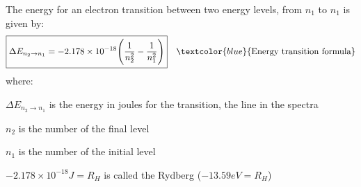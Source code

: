 \documentclass[main.tex]{subfiles}
\newcommand\chapterlabel{electrons}
\begin{document}
\begin{description}
\begin{center}
{}\end{center}


 

 
 
 
The energy for an electron transition between two energy levels, from $n_1$ to $n_1$ is given by:
\begin{equation*}
\boxed{  \Delta E_{n_2\rightarrow n_1}=-2.178\times 10^{-18} \Bigg( \frac{1}{n_2^2}-\frac{1}{n_1^2}\Bigg)  } \quad \textcolor{blue}{\text{Energy transition formula}}
\end{equation*}
where:
\begin{where}
 \item $\Delta E_{{n_2}\rightarrow n{_1}}$   is the energy in joules for the transition, the line in the spectra
 \item $n_2$  is the number of the final level
  \item $n_1$  is the number of the initial level
    \item $-2.178\times 10^{-18}J=R_H$  is called the Rydberg ($-13.59eV=R_H$)

\end{where}



\end{description}
\end{document}
